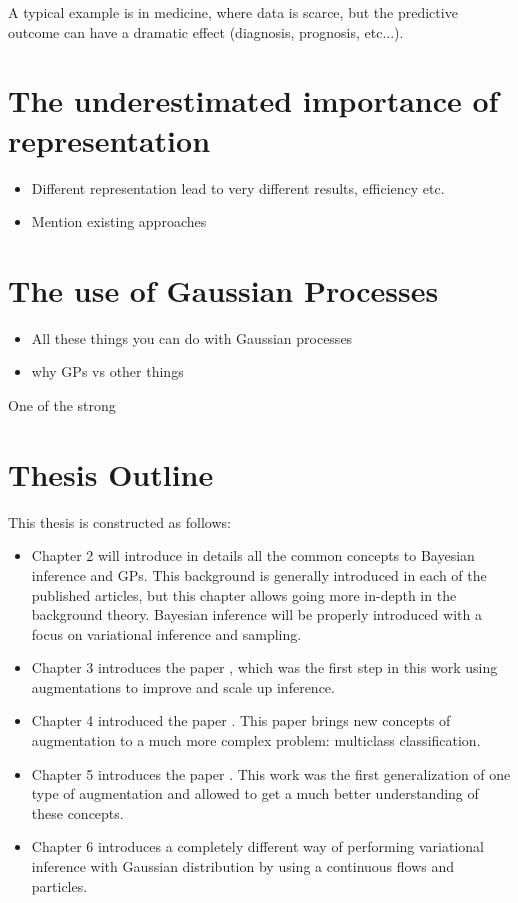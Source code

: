 A typical example is in medicine, where data is scarce, but the predictive outcome can have a dramatic effect (diagnosis, prognosis, etc...).



\section{The underestimated importance of representation}

\begin{itemize}
    \item Different representation lead to very different results, efficiency etc.
    \item Mention existing approaches
\end{itemize}


\section{The use of Gaussian Processes}

\begin{itemize}
    \item All these things you can do with Gaussian processes
    \item why \ac{GPs} vs other things
\end{itemize}

One of the strong

\section{Thesis Outline}

This thesis is constructed as follows:
\begin{itemize}
    \item Chapter 2 will introduce in details all the common concepts to Bayesian inference and \ac{GPs}.
          This background is generally introduced in each of the published articles, but this chapter allows going more in-depth in the background theory.
          Bayesian inference will be properly introduced with a focus on variational inference and sampling.
    \item Chapter 3 introduces the paper , which was the first step in this work using augmentations to improve and scale up inference.
    \item Chapter 4 introduced the paper .
          This paper brings new concepts of augmentation to a much more complex problem: multiclass classification.
    \item Chapter 5 introduces the paper .
          This work was the first generalization of one type of augmentation and allowed to get a much better understanding of these concepts.
    \item Chapter 6 introduces a completely different way of performing variational inference with Gaussian distribution by using a continuous flows and particles.

\end{itemize}

